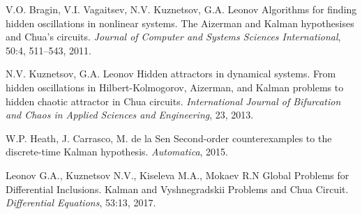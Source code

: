 \documentclass{ifacconf}
\theoremstyle{plain}
\begin{document}
\begin{thebibliography}{xx}
 V.O. Bragin, V.I. Vagaitsev, N.V. Kuznetsov, G.A. Leonov
 \newblock Algorithms for finding hidden oscillations in nonlinear systems. The Aizerman and Kalman hypothesises and Chua's circuits.
 \newblock \emph{Journal of Computer and Systems Sciences International}, 50:4, 511--543, 2011.

 N.V. Kuznetsov, G.A. Leonov
 \newblock Hidden attractors in dynamical systems. From hidden oscillations in Hilbert-Kolmogorov, Aizerman, and Kalman problems to hidden chaotic attractor in Chua circuits.
 \newblock \emph{International Journal of Bifurcation and Chaos in Applied Sciences and Engineering}, 23, 2013.

 W.P. Heath, J. Carrasco, M. de la Sen
 \newblock Second-order counterexamples to the discrete-time Kalman hypothesis.
 \newblock \emph{Automatica}, 2015.

 Leonov G.A., Kuznetsov N.V., Kiseleva M.A., Mokaev R.N
 \newblock Global Problems for Differential Inclusions. Kalman and Vyshnegradskii Problems and Chua Circuit.
 \newblock \emph{Differential Equations}, 53:13, 2017.

 \end{thebibliography}

\end{document}
